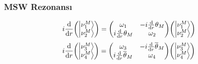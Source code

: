 \documentclass[10pt]{beamer}
\begin{document}
\begin{frame}
    \frametitle{MSW Rezonansı}
    \hrulefill
    \tiny
    \begin{equation*}
        i \dv{r} \mqty(\ket{\nu^{M}_{1}}\\ \ket{\nu^{M}_{2}}) = \mqty(\omega_{1} & -i \dv{r}\theta_{M} \\ i \dv{r}\theta_{M} & \omega_{2}) \mqty(\ket{\nu^{M}_{1}}\\ \ket{\nu^{M}_{2}})
    \end{equation*}
    \begin{equation*}
        i \dv{r} \mqty(\ket{\nu^{M}_{3}}\\ \ket{\nu^{M}_{4}}) = \mqty(\omega_{3} & -i \dv{r}\overline{\theta}_{M} \\ i \dv{r}\overline{\theta}_{M} & \omega_{4}) \mqty(\ket{\nu^{M}_{3}}\\ \ket{\nu^{M}_{4}})
    \end{equation*}
    \normalsize
    \hrulefill
    

\end{frame}
\end{document}
